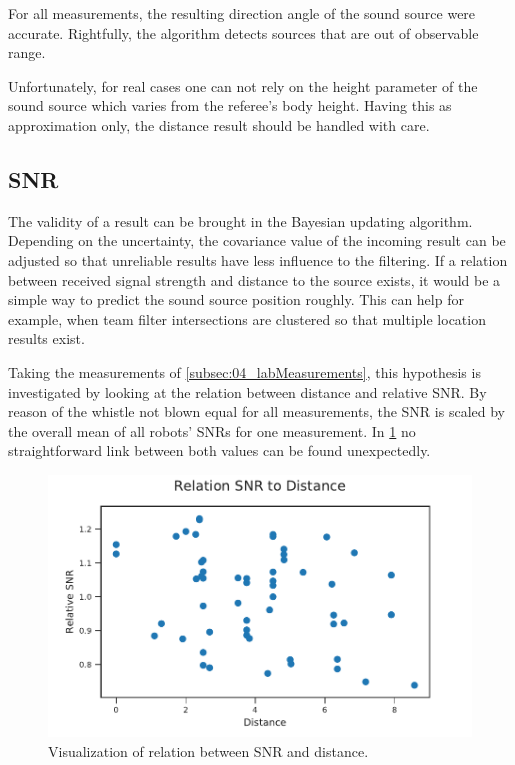 For all measurements, the resulting direction angle of the sound source were
accurate.
Rightfully, the algorithm detects sources that are out of observable range.

Unfortunately, for real cases one can not rely on the height parameter of the sound
source which varies from the referee's body height.
Having this as approximation only, the distance result should be handled
with care.

\subsection{SNR}
\label{subsec:04_snr}

The validity of a result can be brought in the Bayesian updating algorithm.
Depending on the uncertainty, the covariance value of the incoming result can be adjusted
so that unreliable results have less influence to the filtering.
If a relation between received signal strength and distance to the source exists,
it would be a simple way to predict the sound source position roughly.
This can help for example, when team filter intersections are clustered so that
multiple location results exist.

Taking the measurements of \cref{subsec:04_labMeasurements}, this hypothesis is
investigated by looking at the relation between distance and relative \ac{SNR}.
By reason of the whistle not blown equal for all measurements,
the \ac{SNR} is scaled by the overall mean of all robots' \acp{SNR} for one
measurement.
In \cref{fig:04_snrDistance} no straightforward
link between both values can be found unexpectedly.
\begin{figure}[ht]
	\centering
	\includegraphics[]{figures/evaluation/snr_scatter}
	\caption{Visualization of relation between SNR and distance.}
	\label{fig:04_snrDistance}
\end{figure}

